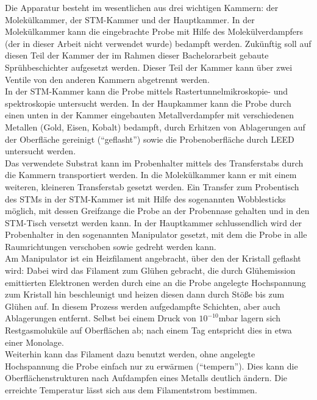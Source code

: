 Die Apparatur besteht im wesentlichen aus drei wichtigen Kammern: 
der 
Molekülkammer, der STM-Kammer und der Hauptkammer. In der Molekülkammer kann die eingebrachte
Probe mit Hilfe des Molekülverdampfers (der in dieser Arbeit nicht verwendet wurde) bedampft werden.
Zukünftig soll auf diesen Teil der Kammer der im Rahmen dieser Bachelorarbeit gebaute
Sprühbeschichter aufgesetzt werden. Dieser Teil der Kammer kann über zwei Ventile von den anderen
Kammern abgetrennt werden.\\
In der STM-Kammer kann die Probe
mittels Rastertunnelmikroskopie- und spektroskopie untersucht werden. In der Haupkammer kann die
Probe durch einen unten in der Kammer eingebauten Metallverdampfer mit
verschiedenen Metallen (Gold, Eisen, Kobalt) bedampft, durch Erhitzen von Ablagerungen auf der
Oberfläche gereinigt ("`geflasht"') sowie die Probenoberfläche durch LEED untersucht werden. 
\\
Das verwendete Substrat kann im Probenhalter mittels des
Transferstabs durch die Kammern transportiert werden. In die Molekülkammer kann er mit einem
weiteren, kleineren Transferstab gesetzt werden. Ein Transfer zum Probentisch des STMs in der
STM-Kammer ist mit Hilfe des sogenannten Wobblesticks möglich, mit dessen Greifzange die Probe an der Probennase gehalten und in
den STM-Tisch versetzt werden kann. In der Hauptkammer schlussendlich wird der Probenhalter in den
sogenannten Manipulator gesetzt, mit dem die Probe in alle Raumrichtungen verschoben sowie gedreht
werden kann. \\
Am Manipulator ist ein Heizfilament angebracht, über den der Kristall geflasht wird:
Dabei wird das Filament zum Glühen gebracht, die durch Glühemission emittierten Elektronen werden
durch eine an die Probe angelegte Hochspannung zum Kristall hin beschleunigt und heizen diesen dann
durch Stöße bis zum Glühen auf. In diesem Prozess werden aufgedampfte Schichten, aber auch
Ablagerungen entfernt. Selbst bei einem Druck von $10^{-10}$mbar lagern sich Restgasmoluküle auf
Oberflächen ab; nach einem Tag entspricht dies in etwa einer Monolage.\\
Weiterhin kann das Filament dazu benutzt werden, ohne angelegte Hochspannung die Probe einfach nur
zu erwärmen ("`tempern"'). Dies kann die Oberflächenstrukturen nach Aufdampfen eines Metalls
deutlich ändern. Die erreichte Temperatur lässt sich aus dem Filamentstrom bestimmen.\\
